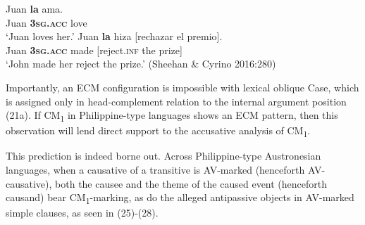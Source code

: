 \documentclass[10pt]{article}
\begin{document}
\begin{exe}
\begin{xlist}
\ex
\gll Juan \textbf{la} ama.\\
Juan \textsc{\textbf{3sg.acc}} love\\
\trans `Juan loves her.'
\ex 
\gll Juan \textbf{la} hiza [rechazar el premio].\\
Juan \textsc{\textbf{3sg.acc}} made [reject.\textsc{inf} the prize]\\
\trans `John made her reject the prize.' (Sheehan \& Cyrino 2016:280)


\end{xlist}
\end{exe}

\noindent Importantly, an ECM configuration is impossible with lexical oblique Case, which is assigned only in head-complement relation to the internal argument position (21a). If CM\textsubscript{1} in Philippine-type languages shows an ECM pattern, then this observation will lend direct support to the accusative analysis of CM\textsubscript{1}.

This prediction is indeed borne out. Across Philippine-type Austronesian languages, when a causative of a transitive is AV-marked (henceforth AV-causative), both the causee and the theme of the caused event (henceforth causand) bear CM\textsubscript{1}-marking, as do the alleged antipassive objects in AV-marked simple clauses, as seen in (25)-(28).
\end{document}
